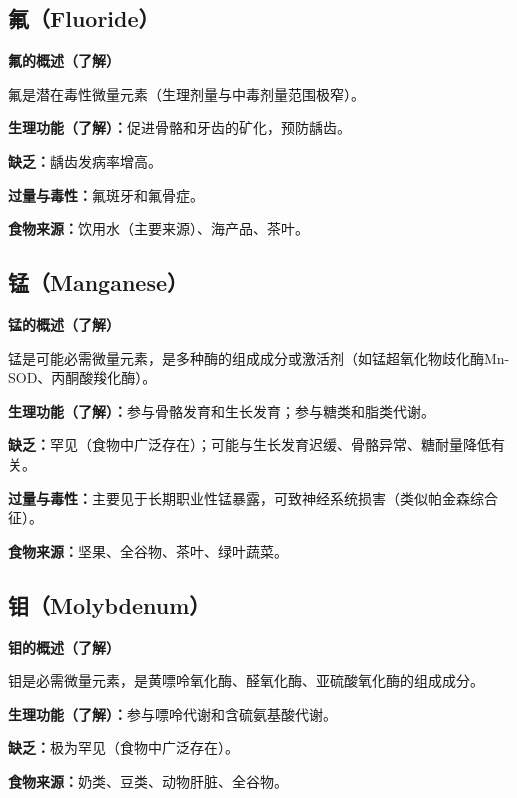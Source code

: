 \subsection{氟（Fluoride）}

\begin{tipbox}
\textbf{氟的概述（了解）}

氟是潜在毒性微量元素（生理剂量与中毒剂量范围极窄）。

\textbf{生理功能（了解）：}促进骨骼和牙齿的矿化，预防龋齿。

\textbf{缺乏：}龋齿发病率增高。

\textbf{过量与毒性：}氟斑牙和氟骨症。

\textbf{食物来源：}饮用水（主要来源）、海产品、茶叶。
\end{tipbox}

\subsection{锰（Manganese）}

\begin{tipbox}
\textbf{锰的概述（了解）}

锰是可能必需微量元素，是多种酶的组成成分或激活剂（如锰超氧化物歧化酶Mn-SOD、丙酮酸羧化酶）。

\textbf{生理功能（了解）：}参与骨骼发育和生长发育；参与糖类和脂类代谢。

\textbf{缺乏：}罕见（食物中广泛存在）；可能与生长发育迟缓、骨骼异常、糖耐量降低有关。

\textbf{过量与毒性：}主要见于长期职业性锰暴露，可致神经系统损害（类似帕金森综合征）。

\textbf{食物来源：}坚果、全谷物、茶叶、绿叶蔬菜。
\end{tipbox}

\subsection{钼（Molybdenum）}

\begin{tipbox}
\textbf{钼的概述（了解）}

钼是必需微量元素，是黄嘌呤氧化酶、醛氧化酶、亚硫酸氧化酶的组成成分。

\textbf{生理功能（了解）：}参与嘌呤代谢和含硫氨基酸代谢。

\textbf{缺乏：}极为罕见（食物中广泛存在）。

\textbf{食物来源：}奶类、豆类、动物肝脏、全谷物。
\end{tipbox}

